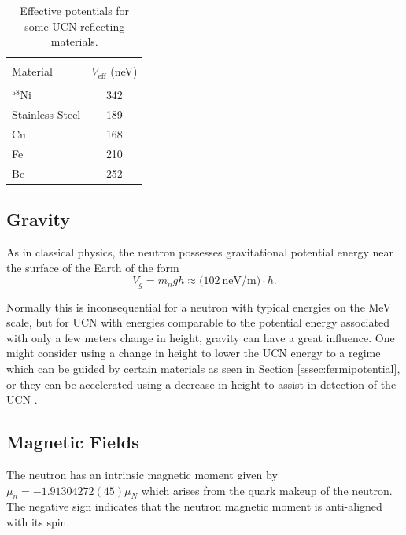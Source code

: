 \begin{table}[h]
  \caption{Effective potentials for some UCN reflecting materials.} 
  \centering
  \begin{tabular}{l c }
    \hline \\ [-1.75ex]
    Material & $V_{\mathrm{eff}}$ (neV) \\
    \hline \hline \\ [-1.75ex]
    $^{58}\mathrm{Ni}$ & 342 \\
    Stainless Steel & 189 \\
    Cu & 168 \\
    Fe & 210 \\
    Be & 252 \\
    \hline
  \end{tabular}
  \label{tab:fermipotential}
\end{table}


\subsection{Gravity}

As in classical physics, the neutron possesses gravitational potential energy near the surface of the Earth of the form
%
\begin{equation}
  V_g = m_ngh \approx \big(102 \mathrm{~neV/m}\big) \cdot h.
\end{equation}

Normally this is inconsequential for a neutron with typical energies on the MeV scale,
but for UCN with energies comparable to the potential energy associated with only a few
meters change in height, gravity can have a great influence. One might consider using
a change in height to lower the UCN energy to a regime which can be guided by certain
materials as seen in Section \ref{sssec:fermipotential}, or they can be accelerated using
a decrease in height to assist in detection of the UCN \cite{golub1991ultra}.

\subsection{Magnetic Fields}

The neutron has an intrinsic magnetic moment given by
${\mu}_n = -1.91304272(45){\mu}_N$ \cite{pdg} which arises from the quark makeup of the neutron.
The negative sign indicates that the neutron magnetic moment is anti-aligned with its spin.

